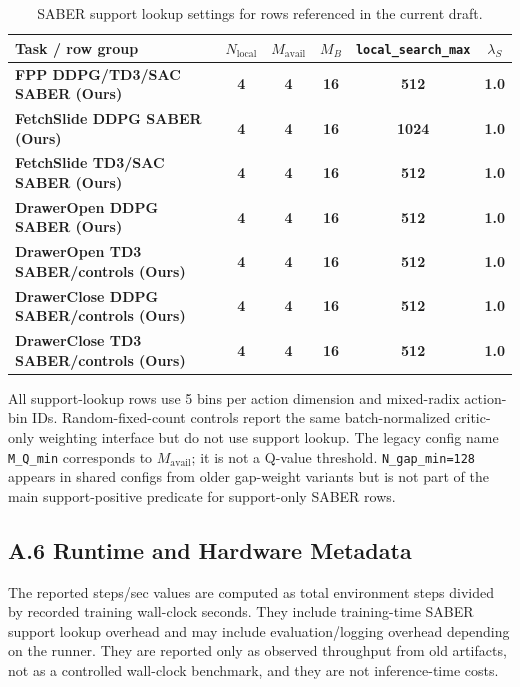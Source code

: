 \documentclass[letterpaper]{article}
\newcommand{\ours}[1]{\textbf{#1 (Ours)}}
\newcommand{\ourscell}[1]{\textbf{#1}}
\begin{document}
\begin{table}[h]
\centering
\caption{SABER support lookup settings for rows referenced in the current draft.}
\label{tab:appendix-support-settings}
\begin{tabular}{lccccc}
\toprule
Task / row group & \(N_{\mathrm{local}}\) & \(M_{\mathrm{avail}}\) & \(M_B\) & \texttt{local\_search\_max} & \(\lambda_S\) \\
\midrule
\ours{FPP DDPG/TD3/SAC SABER} & \ourscell{4} & \ourscell{4} & \ourscell{16} & \ourscell{512} & \ourscell{1.0} \\
\ours{FetchSlide DDPG SABER} & \ourscell{4} & \ourscell{4} & \ourscell{16} & \ourscell{1024} & \ourscell{1.0} \\
\ours{FetchSlide TD3/SAC SABER} & \ourscell{4} & \ourscell{4} & \ourscell{16} & \ourscell{512} & \ourscell{1.0} \\
\ours{DrawerOpen DDPG SABER} & \ourscell{4} & \ourscell{4} & \ourscell{16} & \ourscell{512} & \ourscell{1.0} \\
\ours{DrawerOpen TD3 SABER/controls} & \ourscell{4} & \ourscell{4} & \ourscell{16} & \ourscell{512} & \ourscell{1.0} \\
\ours{DrawerClose DDPG SABER/controls} & \ourscell{4} & \ourscell{4} & \ourscell{16} & \ourscell{512} & \ourscell{1.0} \\
\ours{DrawerClose TD3 SABER/controls} & \ourscell{4} & \ourscell{4} & \ourscell{16} & \ourscell{512} & \ourscell{1.0} \\
\bottomrule
\end{tabular}
\end{table}

All support-lookup rows use 5 bins per action dimension and mixed-radix action-bin IDs. Random-fixed-count controls report the same batch-normalized critic-only weighting interface but do not use support lookup. The legacy config name \texttt{M\_Q\_min} corresponds to \(M_{\mathrm{avail}}\); it is not a Q-value threshold. \texttt{N\_gap\_min=128} appears in shared configs from older gap-weight variants but is not part of the main support-positive predicate for support-only SABER rows.

\subsection{A.6 Runtime and Hardware Metadata}

The reported steps/sec values are computed as total environment steps divided by recorded training wall-clock seconds. They include training-time SABER support lookup overhead and may include evaluation/logging overhead depending on the runner. They are reported only as observed throughput from old artifacts, not as a controlled wall-clock benchmark, and they are not inference-time costs.
\end{document}
